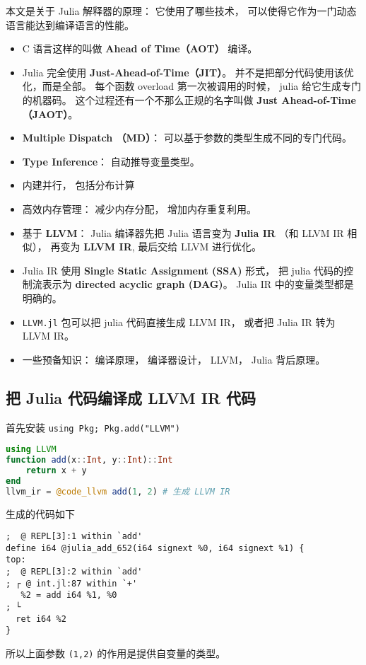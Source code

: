 
\begin{issues}
\issueDraft
\end{issues}

本文是关于 Julia 解释器的原理： 它使用了哪些技术， 可以使得它作为一门动态语言能达到编译语言的性能。

\begin{itemize}
\item C 语言这样的叫做 \textbf{Ahead of Time（AOT）} 编译。
\item Julia 完全使用 \textbf{Just-Ahead-of-Time（JIT）}。 并不是把部分代码使用该优化，而是全部。 每个函数 overload 第一次被调用的时候， julia 给它生成专门的机器码。 这个过程还有一个不那么正规的名字叫做 \textbf{Just Ahead-of-Time（JAOT）}。
\item \textbf{Multiple Dispatch （MD）}： 可以基于参数的类型生成不同的专门代码。
\item \textbf{Type Inference}： 自动推导变量类型。
\item 内建并行， 包括分布计算
\item 高效内存管理： 减少内存分配， 增加内存重复利用。
\item 基于 \textbf{LLVM}： Julia 编译器先把 Julia 语言变为 \textbf{Julia IR} （和 LLVM IR 相似）， 再变为 \textbf{LLVM IR}, 最后交给 LLVM 进行优化。
\item Julia IR 使用 \textbf{Single Static Assignment (SSA)} 形式， 把 julia 代码的控制流表示为 \textbf{directed acyclic graph (DAG)}。 Julia IR 中的变量类型都是明确的。
\item \verb|LLVM.jl| 包可以把 julia 代码直接生成 LLVM IR， 或者把 Julia IR 转为 LLVM IR。
\item 一些预备知识： 编译原理， 编译器设计， LLVM， Julia 背后原理。
\end{itemize}

\subsection{把 Julia 代码编译成 LLVM IR 代码}
首先安装 \verb|using Pkg; Pkg.add("LLVM")|
\begin{lstlisting}[language=julia]
using LLVM
function add(x::Int, y::Int)::Int
    return x + y
end
llvm_ir = @code_llvm add(1, 2) # 生成 LLVM IR
\end{lstlisting}
生成的代码如下
\begin{lstlisting}[language=none]
;  @ REPL[3]:1 within `add'
define i64 @julia_add_652(i64 signext %0, i64 signext %1) {
top:
;  @ REPL[3]:2 within `add'
; ┌ @ int.jl:87 within `+'
   %2 = add i64 %1, %0
; └
  ret i64 %2
}
\end{lstlisting}
所以上面参数 \verb|(1,2)| 的作用是提供自变量的类型。
